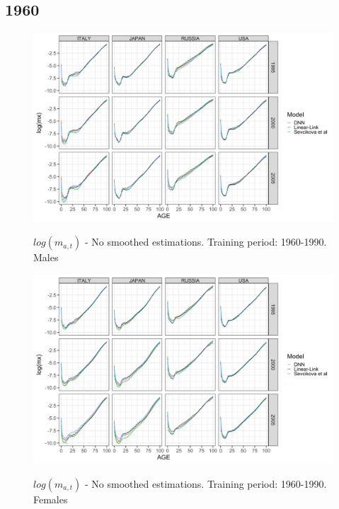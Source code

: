 \documentclass[a4,11pt]{article}
\begin{document}
\subsection{1960}
\begin{figure}[H]
	\centering
	\includegraphics[width=1\linewidth]{NO_S_age_pattern_M_1960}\\
	\caption{$log(m_{a,t})$ - No smoothed estimations. Training period: 1960-1990. Males} 
\end{figure}

\begin{figure}[H]
	\centering
	\includegraphics[width=1\linewidth]{NO_S_age_pattern_F_1960}\\
	\caption{$log(m_{a,t})$ - No smoothed estimations. Training period: 1960-1990. Females} 
\end{figure}
\end{document}
